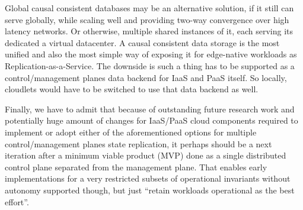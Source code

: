 \documentclass[conference]{IEEEtran}
\begin{document}
Global causal consistent databases\cite{b6} may be an alternative solution, if
it still can serve globally, while scaling well and providing two-way
convergence over high latency networks. Or otherwise, multiple shared instances
of it, each serving its dedicated a virtual datacenter. A causal consistent
data storage is the most unified and also the most simple way of exposing it
for edge-native workloads as Replication-as-a-Service. The downside is such a
thing has to be supported as a control/management planes data backend for IaaS
and PaaS itself. So locally, cloudlets would have to be switched to use that
data backend as well.

Finally, we have to admit that because of outstanding future research work and
potentially huge amount of changes for IaaS/PaaS cloud components required to
implement or adopt either of the aforementioned options for multiple
control/management planes state replication, it perhaps should be a next
iteration after a minimum viable product (MVP) done as a single distributed
control plane separated from the management plane. That enables early
implementations for a very restricted subsets of operational invariants without
autonomy supported though, but just ``retain workloads operational as the best
effort''.
\end{document}

